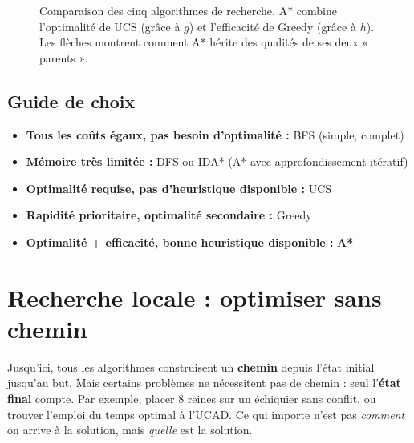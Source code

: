 \documentclass[11pt,a4paper]{article}
\begin{document}
\begin{figure}[h]
\caption{Comparaison des cinq algorithmes de recherche. A* combine l'optimalité de UCS (grâce à $g$) et l'efficacité de Greedy (grâce à $h$). Les flèches montrent comment A* hérite des qualités de ses deux « parents ».}
\label{fig:comparaison}
\end{figure}

\subsection{Guide de choix}

\begin{retenirbox}
\begin{itemize}
    \item \textbf{Tous les coûts égaux, pas besoin d'optimalité :} BFS (simple, complet)
    \item \textbf{Mémoire très limitée :} DFS ou IDA* (A* avec approfondissement itératif)
    \item \textbf{Optimalité requise, pas d'heuristique disponible :} UCS
    \item \textbf{Rapidité prioritaire, optimalité secondaire :} Greedy
    \item \textbf{Optimalité + efficacité, bonne heuristique disponible :} \textbf{A*}
\end{itemize}
\end{retenirbox}

\section{Recherche locale : optimiser sans chemin}

Jusqu'ici, tous les algorithmes construisent un \textbf{chemin} depuis l'état initial jusqu'au but. Mais certains problèmes ne nécessitent pas de chemin : seul l'\textbf{état final} compte. Par exemple, placer 8 reines sur un échiquier sans conflit, ou trouver l'emploi du temps optimal à l'UCAD. Ce qui importe n'est pas \textit{comment} on arrive à la solution, mais \textit{quelle} est la solution.
\end{document}
